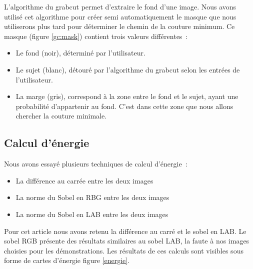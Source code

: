 \documentclass[a4paper]{article}
\begin{document}
L'algorithme du grabcut permet d'extraire le fond d'une image. 
Nous avons utilisé cet algorithme pour créer semi automatiquement le masque que nous utiliserons plus tard
pour déterminer le chemin de la couture minimum. 
Ce masque (figure \ref{gc:mask}) contient trois valeurs différentes~:

\begin{itemize}
    \item Le fond (noir), déterminé par l'utilisateur. 
    \item Le sujet (blanc), détouré par l'algorithme du grabcut selon les entrées de l'utilisateur.
    \item La marge (gris), correspond à la zone entre le fond et le sujet, ayant une probabilité d'appartenir au fond. C'est dans cette zone que nous allons chercher la couture minimale.
\end{itemize}

\subsection{Calcul d'énergie}

Nous avons essayé plusieurs techniques de calcul d'énergie~:

\begin{itemize}
    \item La différence au carrée entre les deux images
    \item La norme du Sobel en RBG entre les deux images
    \item La norme du Sobel en LAB entre les deux images
\end{itemize}

Pour cet article nous avons retenu la différence au carré et le sobel en LAB. Le sobel RGB présente des résultats
similaires au sobel LAB, la faute à nos images choisies pour les démonstrations. %
Les résultats de ces calculs sont visibles sous forme de cartes d'énergie figure \ref{energie}.
\end{document}
